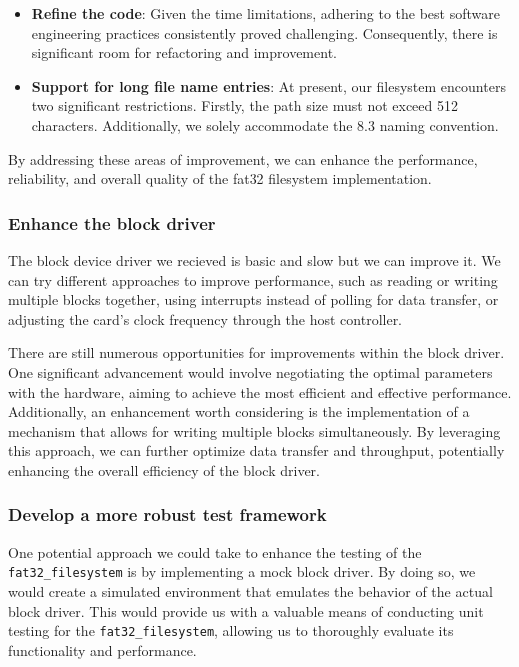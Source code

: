 {\begin{itemize}
    \item \textbf{Refine the code}: Given the time limitations, adhering to the best software engineering practices consistently proved challenging. Consequently, there is significant room for refactoring and improvement.

    \item \textbf{Support for long file name entries}: At present, our filesystem encounters two significant restrictions. Firstly, the path size must not exceed 512 characters. Additionally, we solely accommodate the 8.3 naming convention.
    
\end{itemize}


By addressing these areas of improvement, we can enhance the performance, reliability, and overall quality of the fat32 filesystem implementation.

\subsubsection{Enhance the block driver}

The block device driver we recieved is basic and slow but we can improve it. We can try different approaches to improve performance, such as reading or writing multiple blocks together, using interrupts instead of polling for data transfer, or adjusting the card's clock frequency through the host controller. 

There are still numerous opportunities for improvements within the block driver. One significant advancement would involve negotiating the optimal parameters with the hardware, aiming to achieve the most efficient and effective performance. Additionally, an enhancement worth considering is the implementation of a mechanism that allows for writing multiple blocks simultaneously. By leveraging this approach, we can further optimize data transfer and throughput, potentially enhancing the overall efficiency of the block driver.

\subsubsection{Develop a more robust test framework}

One potential approach we could take to enhance the testing of the \texttt{fat32\_filesystem} is by implementing a mock block driver. By doing so, we would create a simulated environment that emulates the behavior of the actual block driver. This would provide us with a valuable means of conducting unit testing for the \texttt{fat32\_filesystem}, allowing us to thoroughly evaluate its functionality and performance.

}
